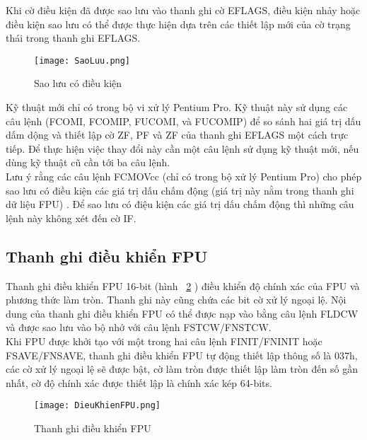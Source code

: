	Khi cờ điều kiện đã được sao lưu vào thanh ghi cờ EFLAGS, điều kiện nhảy hoặc điều kiện sao lưu có thể được thực hiện dựa trên các thiết lập mới của cờ trạng thái trong thanh ghi EFLAGS.
	\begin{center}
			\begin{figure}[htp]
				\begin{center}
					\texttt{[image: SaoLuu.png]}
				\end{center}
				\caption{Sao lưu có điều kiện \protect\footnotemark}				
				\label{fig:SaoLuu}				
			\end{figure}
		\end{center}	
		
		Kỹ thuật mới chỉ có trong bộ vi xử lý Pentium Pro. Kỹ thuật này sử dụng các câu lệnh (FCOMI, FCOMIP, FUCOMI, và FUCOMIP) để so sánh hai giá trị dấu dấm dộng và thiết lập cờ ZF, PF và ZF của thanh ghi EFLAGS một cách trực tiếp. Để thực hiện việc thay đổi này cần một câu lệnh sử dụng kỹ thuật mới, nếu dùng kỹ thuật cũ cần tới ba câu lệnh. \\
		
	Lưu ý rằng các câu lệnh FCMOVcc (chỉ có trong bộ xử lý Pentium Pro) cho phép sao lưu có điều kiện các giá trị dấu chấm động (giá trị này nằm trong thanh ghi dữ liệu FPU) . Để sao lưu có điệu kiện các giá trị dấu chấm động thì những câu lệnh này không xét đến cờ IF.
	
		\subsection*{Thanh ghi điều khiển FPU}
		Thanh ghi điều khiển FPU 16-bit (hình ~\ref{fig:DieuKhienFPU} ) điều khiển độ chính xác của FPU và phương thức làm tròn. Thanh ghi này cũng chứa các bit cờ xử lý ngoại lệ. Nội dung của thanh ghi điều khiển FPU có thể được nạp vào bằng câu lệnh FLDCW và được sao lưu vào bộ nhớ với câu lệnh FSTCW/FNSTCW.\\
		
	Khi FPU được khởi tạo với một trong hai câu lệnh FINIT/FNINIT hoặc FSAVE/FNSAVE, thanh ghi điều khiển FPU tự động thiết lập thông số là 037h, các cờ xử lý ngoại lệ sẽ được bật, cờ làm tròn được thiết lập làm tròn đến số gần nhất, cờ độ chính xác được thiết lập là chính xác kép 64-bits.
		\begin{center}
			\begin{figure}[htp]
				\begin{center}
					\texttt{[image: DieuKhienFPU.png]}
				\end{center}
				\caption{Thanh ghi điều khiển FPU \protect\footnotemark}				
				\label{fig:DieuKhienFPU}				
			\end{figure}
		\end{center}	

